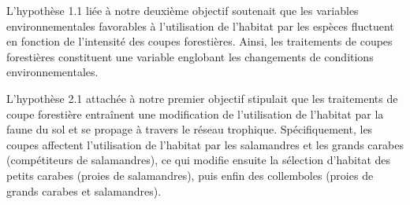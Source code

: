 L'hypothèse 1.1 liée à notre deuxième objectif soutenait que les variables environnementales favorables à l'utilisation de l'habitat par les espèces fluctuent 
en fonction de l'intensité des coupes forestières. Ainsi, les traitements de coupes forestières constituent une variable englobant 
les changements de conditions environnementales.

L'hypothèse 2.1 attachée à notre premier objectif stipulait que les traitements de coupe forestière entraînent une modification de l'utilisation de l'habitat 
par la faune du sol et se propage à travers le réseau trophique. Spécifiquement, les coupes affectent l'utilisation de l'habitat par les salamandres et 
les grands carabes (compétiteurs de salamandres), ce qui modifie ensuite la sélection d'habitat des petits carabes (proies de salamandres), puis enfin des collemboles (proies de grands carabes et salamandres).



\cleardoublepage



